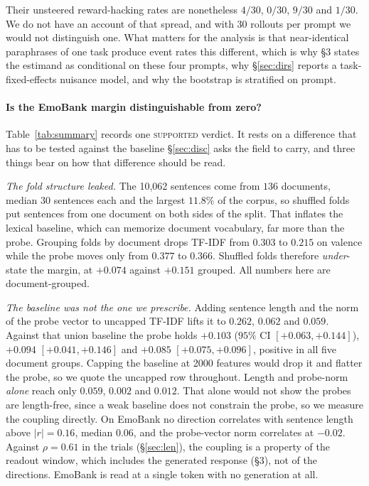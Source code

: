 Their unsteered reward-hacking rates are nonetheless $4/30$, $0/30$, $9/30$ and
$1/30$. We do not have an account of that spread, and with 30 rollouts per prompt we
would not distinguish one. What matters for the analysis is that near-identical
paraphrases of one task produce event rates this different, which is why \S3 states
the estimand as conditional on these four prompts, why \S\ref{sec:dirs} reports a
task-fixed-effects nuisance model, and why the bootstrap is stratified on prompt.

\paragraph{Is the EmoBank margin distinguishable from zero?} Table~\ref{tab:summary}
records one \textsc{supported} verdict. It rests on a difference that has to be
tested against the baseline \S\ref{sec:disc} asks the field to carry, and three
things bear on how that difference should be read.

\emph{The fold structure leaked.} The 10,062 sentences come from $136$ documents,
median $30$ sentences each and the largest $11.8\%$ of the corpus, so shuffled
folds put sentences from one document on both sides of the split. That inflates the
lexical baseline, which can memorize document vocabulary, far more than the probe.
Grouping folds by document drops TF-IDF from $0.303$ to $0.215$ on valence while
the probe moves only from $0.377$ to $0.366$. Shuffled folds therefore
\emph{under}-state the margin, at $+0.074$ against $+0.151$ grouped. All numbers
here are document-grouped.

\emph{The baseline was not the one we prescribe.} Adding sentence length and the
norm of the probe vector to uncapped TF-IDF lifts it to $0.262$, $0.062$ and
$0.059$. Against that union baseline the probe holds $+0.103$ ($95\%$ CI
$[+0.063, +0.144]$), $+0.094$ $[+0.041, +0.146]$ and $+0.085$ $[+0.075, +0.096]$,
positive in all five document groups. Capping the baseline at 2000 features would
drop it and flatter the probe, so we quote the uncapped row throughout. Length and probe-norm \emph{alone} reach only $0.059$, $0.002$ and $0.012$. That
alone would not show the probes are length-free, since a weak baseline does not
constrain the probe, so we measure the coupling directly. On EmoBank no direction
correlates with sentence length above $\lvert r\rvert = 0.16$, median $0.06$, and the
probe-vector norm correlates at $-0.02$. Against $\rho = 0.61$ in the trials
(\S\ref{sec:len}), the coupling is a property of the readout window, which includes
the generated response (\S3), not of the directions. EmoBank is read at a single
token with no generation at all.

